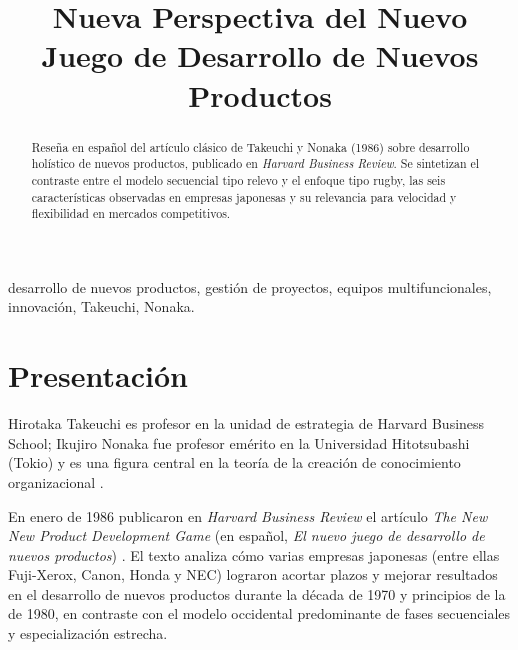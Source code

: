 \documentclass[conference]{IEEEtran}
\newcommand{\PaperTitle}{Nueva Perspectiva del Nuevo Juego de Desarrollo de Nuevos Productos}
\begin{document}
\renewcommand{\abstractname}{Resumen}
\renewcommand{\IEEEkeywordsname}{Términos clave}
\renewcommand{\refname}{Referencias}

\title{\PaperTitle}

\author{
}

\maketitle

\begin{abstract}
Reseña en español del artículo clásico de Takeuchi y Nonaka (1986) sobre desarrollo holístico de nuevos productos, publicado en \emph{Harvard Business Review}. Se sintetizan el contraste entre el modelo secuencial tipo relevo y el enfoque tipo rugby, las seis características observadas en empresas japonesas y su relevancia para velocidad y flexibilidad en mercados competitivos.
\end{abstract}

\begin{IEEEkeywords}
desarrollo de nuevos productos, gestión de proyectos, equipos multifuncionales, innovación, Takeuchi, Nonaka.
\end{IEEEkeywords}

\section{Presentación}

Hirotaka Takeuchi es profesor en la unidad de estrategia de Harvard Business School; Ikujiro Nonaka fue profesor emérito en la Universidad Hitotsubashi (Tokio) y es una figura central en la teoría de la creación de conocimiento organizacional \cite{takeuchiNonaka1986nndp}.

En enero de 1986 publicaron en \emph{Harvard Business Review} el artículo \emph{The New New Product Development Game} (en español, \emph{El nuevo juego de desarrollo de nuevos productos}) \cite{takeuchiNonaka1986nndp}. El texto analiza cómo varias empresas japonesas (entre ellas Fuji-Xerox, Canon, Honda y NEC) lograron acortar plazos y mejorar resultados en el desarrollo de nuevos productos durante la década de 1970 y principios de la de 1980, en contraste con el modelo occidental predominante de fases secuenciales y especialización estrecha.
\end{document}

